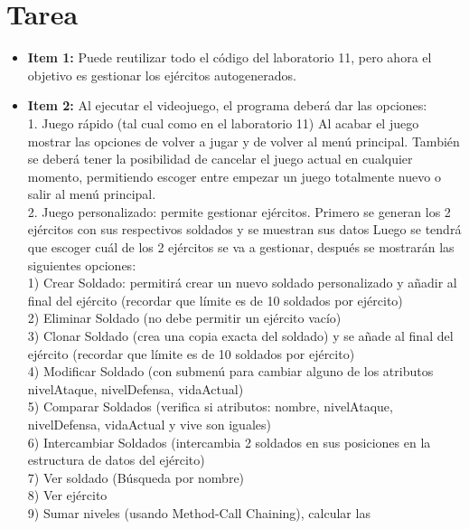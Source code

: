 \documentclass{article}
\begin{document}
\section{Tarea}
\begin{itemize}
	\item \textbf{Item 1:} Puede reutilizar todo el código del laboratorio 11, pero ahora el objetivo es
	      gestionar los ejércitos autogenerados.
	\item \textbf{Item 2:} Al ejecutar el videojuego, el programa deberá dar las opciones:\\
	      1. Juego rápido (tal cual como en el laboratorio 11)
	      Al acabar el juego mostrar las opciones de volver a jugar y de volver al
	      menú principal. También se deberá tener la posibilidad de cancelar el
	      juego actual en cualquier momento, permitiendo escoger entre empezar
	      un juego totalmente nuevo o salir al menú principal.\\
	      2. Juego personalizado: permite gestionar ejércitos. Primero se generan
	      los 2 ejércitos con sus respectivos soldados y se muestran sus datos
	      Luego se tendrá que escoger cuál de los 2 ejércitos se va a gestionar,
	      después se mostrarán las siguientes opciones:\\
	      1) Crear Soldado: permitirá crear un nuevo soldado personalizado
	      y añadir al final del ejército (recordar que límite es de 10
	      soldados por ejército)\\
	      2) Eliminar Soldado (no debe permitir un ejército vacío)\\
	      3) Clonar Soldado (crea una copia exacta del soldado) y se añade
	      al final del ejército (recordar que límite es de 10 soldados por
	      ejército)\\
	      4) Modificar Soldado (con submenú para cambiar alguno de los
	      atributos nivelAtaque, nivelDefensa, vidaActual)\\
	      5) Comparar Soldados (verifica si atributos: nombre, nivelAtaque,
	      nivelDefensa, vidaActual y vive son iguales)\\
	      6) Intercambiar Soldados (intercambia 2 soldados en sus posiciones
	      en la estructura de datos del ejército)\\
	      7) Ver soldado (Búsqueda por nombre)\\
	      8) Ver ejército\\
	      9) Sumar niveles (usando Method-Call Chaining), calcular las

\end{itemize}
\end{document}
